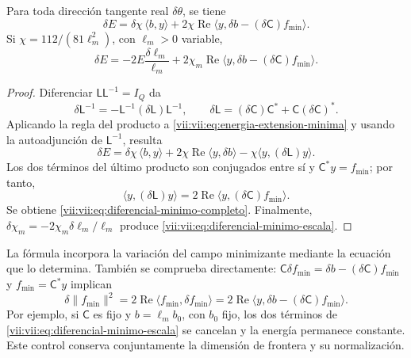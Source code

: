 \begin{theorem}
\label{vii:vii:thm:diferencial-minimo}
Para toda dirección tangente real \(\delta\theta\), se tiene
\begin{equation}
 \delta E
 =\delta\chi\,\langle b,y\rangle
   +2\chi\operatorname{Re}
       \langle y,\delta b-(\delta\mathsf C)f_{\min}\rangle.
 \label{vii:vii:eq:diferencial-minimo-completo}
\end{equation}
Si \(\chi=112/(81\ell_m^2)\), con \(\ell_m>0\) variable,
\begin{equation}
 \delta E=-2E\frac{\delta\ell_m}{\ell_m}
 +2\chi_m\operatorname{Re}
       \langle y,\delta b-(\delta\mathsf C)f_{\min}\rangle.
 \label{vii:vii:eq:diferencial-minimo-escala}
\end{equation}
\end{theorem}

\begin{proof}
Diferenciar \(\mathsf L\mathsf L^{-1}=I_Q\) da
\[
 \delta\mathsf L^{-1}
 =-\mathsf L^{-1}(\delta\mathsf L)\mathsf L^{-1},\qquad
 \delta\mathsf L=(\delta\mathsf C)\mathsf C^*
                      +\mathsf C(\delta\mathsf C)^*.
\]
Aplicando la regla del producto a \eqref{vii:vii:eq:energia-extension-minima}
y usando la autoadjunción de \(\mathsf L^{-1}\), resulta
\[
 \delta E=\delta\chi\,\langle b,y\rangle
 +2\chi\operatorname{Re}\langle y,\delta b\rangle
 -\chi\langle y,(\delta\mathsf L)y\rangle.
\]
Los dos términos del último producto son conjugados entre sí y
\(\mathsf C^*y=f_{\min}\); por tanto,
\[
 \langle y,(\delta\mathsf L)y\rangle
 =2\operatorname{Re}\langle y,(\delta\mathsf C)f_{\min}\rangle.
\]
Se obtiene \eqref{vii:vii:eq:diferencial-minimo-completo}.
Finalmente, \(\delta\chi_m=-2\chi_m\delta\ell_m/\ell_m\)
produce \eqref{vii:vii:eq:diferencial-minimo-escala}.
\end{proof}

La fórmula incorpora la variación del campo minimizante mediante la
ecuación que lo determina. También se comprueba directamente:
\(\mathsf C\delta f_{\min}=\delta b-(\delta\mathsf C)f_{\min}\)
y \(f_{\min}=\mathsf C^*y\) implican
\[
 \delta\|f_{\min}\|^2
 =2\operatorname{Re}\langle f_{\min},\delta f_{\min}\rangle
 =2\operatorname{Re}
     \langle y,\delta b-(\delta\mathsf C)f_{\min}\rangle.
\]
Por ejemplo, si \(\mathsf C\) es fijo y \(b=\ell_m b_0\), con
\(b_0\) fijo, los dos términos de
\eqref{vii:vii:eq:diferencial-minimo-escala} se cancelan y la energía
permanece constante. Este control conserva conjuntamente la dimensión
de frontera y su normalización.

